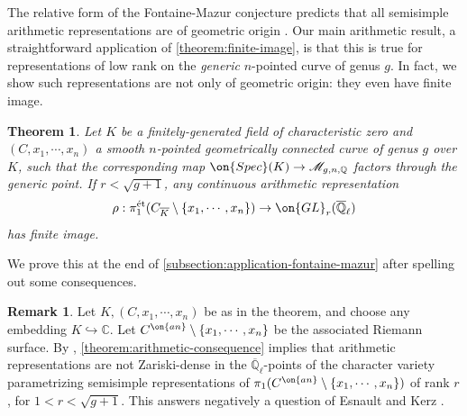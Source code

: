\documentclass[12 pt]{amsart}
\theoremstyle{plain}
\newtheorem{theorem}[subsubsection]{Theorem}
\theoremstyle{definition}
\newtheorem{remark}[subsubsection]{Remark}
\theoremstyle{remark}
\numberwithin{equation}{section}
\begin{document}
The relative form of the Fontaine-Mazur conjecture predicts
that all semisimple arithmetic representations are of geometric origin
\cite[Conjecture 1 bis]{petrov2020geometrically}. Our main arithmetic result, a
straightforward application of \autoref{theorem:finite-image}, is that this is true for representations of low rank on the \emph{generic} $n$-pointed curve of genus $g$. 
In fact, we show such representations are not only of geometric origin:
they even have finite image.
\begin{theorem}\label{theorem:arithmetic-consequence}
Let $K$ be a finitely-generated field of characteristic zero and $(C, x_1,
\cdots, x_n)$ a smooth $n$-pointed geometrically connected curve of genus $g$ 
over $K$,
such that the corresponding map $\on{Spec}(K)\to \mathscr{M}_{g,n, \mathbb{Q}}$ factors through the generic point. 
If $r<\sqrt{g+1}$, any continuous arithmetic representation 
\begin{align*}
\rho: \pi_1^{\text{\'et}}(C_{\overline{K}}\setminus\{x_1, \cdots, x_n\})\to \on{GL}_r(\overline{\mathbb{Q}}_\ell) 
\end{align*}
has finite image.
\end{theorem}
We prove this at the end of \autoref{subsection:application-fontaine-mazur}
after spelling out
some consequences.
\begin{remark}\label{remark:esnault-kerz}
	Let $K, (C, x_1, \cdots, x_n)$ be as in the theorem, and choose any
	embedding $K\hookrightarrow \mathbb{C}$. Let $C^{\on{an}}\setminus\{x_1,
	\cdots, x_n\}$ be the associated Riemann surface. By \cite[Lemma 7.5.1]{LL:geometric-local-systems}, 
	\autoref{theorem:arithmetic-consequence} implies that arithmetic
	representations are not Zariski-dense in the
	$\overline{\mathbb{Q}}_\ell$-points of the character variety
	parametrizing semisimple representations of
	$\pi_1(C^{\on{an}}\setminus\{x_1, \cdots, x_n\})$ of rank $r$, for
	$1<r<\sqrt{g+1}$. This answers negatively a question of Esnault and Kerz
	\cite[Question 9.1(1)]{esnault2020arithmetic}.
\end{remark}
\end{document}
